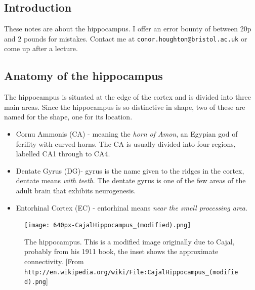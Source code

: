 \documentclass[11pt,a4paper]{scrartcl}
\begin{document}
\subsection*{Introduction}
These notes are about the hippocampus. I offer an error bounty of
between 20p and 2 pounds for mistakes. Contact me at
\texttt{conor.houghton@bristol.ac.uk} or come up after a lecture.

\subsection*{Anatomy of the hippocampus}

The hippocampus is situated at the edge of the cortex and is divided
into three main areas. Since the hippocampus is so distinctive in
shape, two of these are named for the shape, one for its location.
\begin{itemize}
\item Cornu Ammonis (CA) - meaning the \textsl{horn of Amon}, an Egypian god of ferility with curved horns. The CA is usually divided into four regions, labelled CA1 through to CA4.
\item Dentate Gyrus (DG)- gyrus is the name given to the ridges in the
  cortex, dentate means \textsl{with teeth}. The dentate gyrus is one of the few areas of the adult brain that exhibits neurogenesis.
\item Entorhinal Cortex (EC) - entorhinal means \textsl{near the smell processing area}. 
\end{itemize}

\begin{figure}
\begin{center}
\texttt{[image: 640px-CajalHippocampus\_(modified).png]}
\end{center}
\caption{The hippocampus. This is a modified image originally due to Cajal, probably from his 1911 book, the inset shows the approximate connectivity. [From \texttt{http://en.wikipedia.org/wiki/File:CajalHippocampus\_(modified).png}]\label{fig:hippocampus}}
\end{figure}
\end{document}
